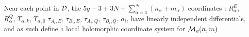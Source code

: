 \documentclass{article}
\begin{document}
\begin{theorem}
Near each point in $\mathcal{D}$, the $5g -3 + 3N + \sum_{\alpha=1}^N (n_\alpha + m_\alpha)$ coordinates : $R_\alpha^E$, $R_\alpha^Q$, $T_{\alpha,k}$, $T_{\alpha,0}$ $\tau_{A_i,E}$, $ \tau_{B_i,E}$, $\tau_{A_i,Q}$, $\tau_{B_i,Q}$, $a_i$, have linearly independent differentials, and as such define a local holomorphic coordinate system for $\mathcal{M}_g(n,m)$
\end{theorem}


\end{document}
